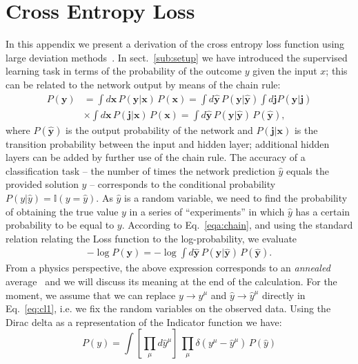\documentclass{article}
\begin{document}
\section{Cross Entropy Loss} \label{a:loss}
%
In this appendix we present a derivation of the cross entropy loss function using large deviation methods~\cite{mezard}. In sect.~\eqref{sub:setup} we have introduced the supervised learning task in terms of the probability of the outcome $y$ given the input $x$; this can be related to the network output by means of the chain rule:
%
\begin{align} \nonumber
P(\mathbf{y}) &= \int d\mathbf{x} \, P(\mathbf{y} | \mathbf{x}) \, P(\mathbf{x}) = \int d \hat{\mathbf{y}} \, P(\mathbf{y} | \hat{\mathbf{y}} ) \int d\mathbf{j}  P(\hat{\mathbf{y}}|\mathbf{j}) \\
&\times \int d\mathbf{x} \, P(\mathbf{j} | \mathbf{x}) \, P(\mathbf{x})
= \int d \hat{\mathbf{y}} \, P(\mathbf{y} | \hat{\mathbf{y}} ) \, P(\hat{\mathbf{y}}),
\label{eqa:chain}
\end{align}
%
where $P(\hat{\mathbf{y}})$ is the output probability of the network and $ P(\mathbf{j} | \mathbf{x})$ is the transition probability between the input and hidden layer; additional hidden layers can be added by further use of the chain rule. The accuracy of a classification task -- the number of times the network prediction $\hat{y}$ equals the provided solution $y$ -- corresponds to the conditional probability $P(y|\hat{y}) =  \mathbb{I}(y = \hat{y})$. As $\hat{y}$ is a random variable, we need to find the probability of obtaining the true value $y$ in a series of ``experiments'' in which $\hat{y}$  has a certain probability to be equal to $y$. According to Eq.~\eqref{eqa:chain}, and using the standard relation relating the Loss function to the log-probability, we evaluate
%
 \begin{align} \label{eq:cl1}
-\log P(\mathbf{y}) = - \log \int d \hat{\mathbf{y}}\, P(\mathbf{y} | \hat{\mathbf{y}}) \, P(\hat{\mathbf{y}}).
 \end{align}
%
From a physics perspective, the above expression corresponds to an {\it annealed } average~\cite{parisi2, giardina} and we will discuss its meaning at the end of the calculation. For the moment, we assume that we can replace $y \to y^{\mu}$ and $\hat{y} \to \hat{y}^{\mu}$ directly in Eq.~\eqref{eq:cl1}, i.e. we fix the random variables on the observed data. Using the Dirac delta  as a representation of the Indicator function we have:
%
 \begin{equation}  \nonumber
 P(y) =  \int  \left[ \prod_{\mu} d \hat{y}^{\mu} \right]  \,  \prod_{\mu} \delta( y^{\mu} - \hat{y}^{\mu})  \, P(\hat{y})
\label{eqa:cl1}
 \end{equation}
\end{document}
